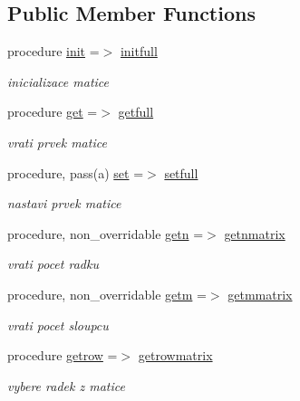 \subsection*{\-Public \-Member \-Functions}
\begin{DoxyCompactItemize}
\item 
procedure \hyperlink{structmtx_1_1fullmtx_a61b753f6a76bcfd96fbe82c26bbdce8b}{init} =$>$ \hyperlink{classmtx_a9d997a2261d0627633b50e21779cafeb}{initfull}
\begin{DoxyCompactList}\small\item\em inicializace matice \end{DoxyCompactList}\item 
procedure \hyperlink{structmtx_1_1fullmtx_a2155f93b9fceea289c90e7f01fb505a7}{get} =$>$ \hyperlink{classmtx_a19fea5b5c69870346797740e80888c31}{getfull}
\begin{DoxyCompactList}\small\item\em vrati prvek matice \end{DoxyCompactList}\item 
procedure, pass(a) \hyperlink{structmtx_1_1fullmtx_ac28edc8d06a554863016c1e369d218c4}{set} =$>$ \hyperlink{classmtx_ad535bdf867ccb7c8e9b27f17609e6517}{setfull}
\begin{DoxyCompactList}\small\item\em nastavi prvek matice \end{DoxyCompactList}\item 
procedure, non\-\_\-overridable \hyperlink{structmtx_1_1matrix_ad43a73f32b347da18f997ce145d6c27c}{getn} =$>$ \hyperlink{classmtx_ab05f486a31448c69570e2144b4010957}{getnmatrix}
\begin{DoxyCompactList}\small\item\em vrati pocet radku \end{DoxyCompactList}\item 
procedure, non\-\_\-overridable \hyperlink{structmtx_1_1matrix_a24f1071ad0cb83094ba23d3027321392}{getm} =$>$ \hyperlink{classmtx_adf266f7c4ef90f6ddc1c654bcad5d149}{getmmatrix}
\begin{DoxyCompactList}\small\item\em vrati pocet sloupcu \end{DoxyCompactList}\item 
procedure \hyperlink{structmtx_1_1matrix_a99c4dff8cf1c63a968d03474084d0b70}{getrow} =$>$ \hyperlink{classmtx_a46e5fd9002257990ea5c79e1971c8167}{getrowmatrix}
\begin{DoxyCompactList}\small\item\em vybere radek z matice \end{DoxyCompactList}\item 

\end{DoxyCompactItemize}
